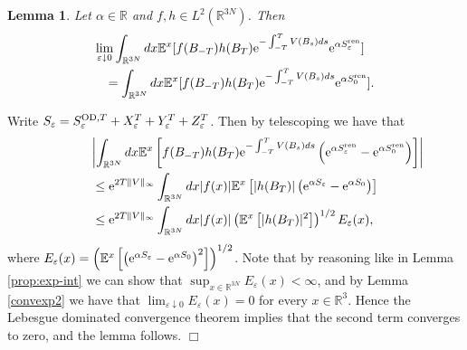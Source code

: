 \documentclass[12pt]{article}
\newtheorem{lemma}[theorem]{Lemma}
\newcommand{\Ebb}{{\mathbb E}}
\providecommand{\qed}{\hfill {$\Box$}\par\medskip}
\providecommand{\BR}{{\mathbb{R}^3 }}
\providecommand{\BRN}{{\mathbb{R}^{3N} }}
\providecommand{\od}{{\rm OD}}
\providecommand{\RR}{\mathbb{R}}
\providecommand{\lk}{\left(}
\providecommand{\rk}{\right)}
\providecommand{\han}{{1/2}}
\providecommand{\non}{\nonumber}
\providecommand{\e}{{\rm e}}
\providecommand{\1}{\mathbb{1}}
\providecommand{\eps}{\varepsilon}
\providecommand{\ren}{{\rm ren}}
\begin{document}
\begin{lemma}
\label{54321}
Let $\alpha\in\RR$ and  $f,h\in L^2(\BRN)$. Then
\begin{eqnarray}
\lefteqn{
\lim_{\eps\downarrow 0}\int_{\BRN} dx  \Ebb^x [f(B_{-T}) h(B_T)  \e^{-\int_{-T}^TV(B_s)ds}
\e^{\alpha S_\eps^\ren }]\non} \\
&&\label{hanatarasi}
= \int_{\BRN} dx  \Ebb^x [f(B_{-T} )h(B_T)\e^{-\int_{-T}^TV(B_s)ds}\e^{\alpha S_0^\ren }].
\end{eqnarray}
\end{lemma}
\proof
Write ${S_\eps}=
S^{\od,T}_\eps+X_\eps^T+Y_\eps^T+Z_\eps^T$. Then by telescoping we have
that
\begin{align*}
&
\lefteqn{
\left|\int_{\BRN} dx   \Ebb^x \left[f(B_{-T}) h(B_T) \e^{-\int_{-T}^TV(B_s)ds}
\lk \e^{\alpha S_\eps^\ren } - \e^{\alpha S_0^\ren }\rk \right]\right| } \\
&\leq
\e^{2T\|V\|_\infty}\int_{\BRN} dx  |f(x)|\Ebb^x \left[ |h(B_{T})|
\lk \e^{\alpha S_\eps} - \e^{\alpha S_0}
\rk \right]\\
&\leq
\e^{2T\|V\|_\infty}\int_{\BRN} dx  |f(x)|
\lk
\Ebb^x
\left[ |h(B_{T})|^2\right]\rk^{\han}
E_\eps(x),
\end{align*}
where $E_\eps(x)= \lk \Ebb^x \left[\lk \e^{\alpha S_\eps} - \e^{\alpha S_0}\rk^2\right]\rk^\han$.
Note that by reasoning like in Lemma \ref{prop:exp-int} we can show that $\sup_{x\in\BRN}E_\eps(x)
<\infty$, and by Lemma \ref{convexp2}  we have that $\lim_{\eps\downarrow 0}E_\eps(x)=0$ for every 
$x\in\BR$. Hence the Lebesgue dominated convergence theorem implies that the second term converges 
to zero, and the lemma follows.
\qed
\end{document}

